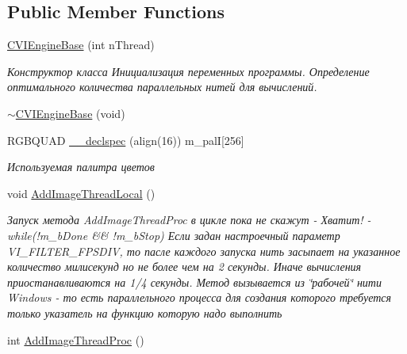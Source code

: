 \subsection*{Public Member Functions}
\begin{DoxyCompactItemize}
\item 
\hyperlink{class_c_v_i_engine_base_a1349de29adc90869f463b17fb03904c1}{C\+V\+I\+Engine\+Base} (int n\+Thread)
\begin{DoxyCompactList}\small\item\em Конструктор класса Инициализация переменных программы. Определение оптимального количества параллельных нитей для вычислений. \end{DoxyCompactList}\item 
\hyperlink{class_c_v_i_engine_base_a28dba2a06eda33294836c5241f497112}{$\sim$\+C\+V\+I\+Engine\+Base} (void)
\item 
R\+G\+B\+Q\+U\+A\+D \hyperlink{class_c_v_i_engine_base_acd0542a6476a6eed4568c900ab5af5d9}{\+\_\+\+\_\+declspec} (align(16)) m\+\_\+pal\+I\mbox{[}256\mbox{]}
\begin{DoxyCompactList}\small\item\em Используемая палитра цветов \end{DoxyCompactList}\item 
void \hyperlink{class_c_v_i_engine_base_a6ca94a8d39e8a76e5be4698cc2eff06b}{Add\+Image\+Thread\+Local} ()
\begin{DoxyCompactList}\small\item\em Запуск метода Add\+Image\+Thread\+Proc в цикле пока не скажут -\/ Хватит! -\/ while(!m\+\_\+b\+Done \&\& !m\+\_\+b\+Stop) Если задан настроечный параметр V\+I\+\_\+\+F\+I\+L\+T\+E\+R\+\_\+\+F\+P\+S\+D\+I\+V, то пасле каждого запуска нить засыпает на указанное количество милисекунд но не более чем на 2 секунды. Иначе вычисления приостанавливаются на 1/4 секунды. Метод вызывается из \char`\"{}рабочей\char`\"{} нити Windows -\/ то есть параллельного процесса для создания которого требуется только указатель на функцию которую надо выполнить \end{DoxyCompactList}\item 
int \hyperlink{class_c_v_i_engine_base_ac9fbe14762f4d2bf7d0bffe451a329ee}{Add\+Image\+Thread\+Proc} ()

\end{DoxyCompactItemize}
